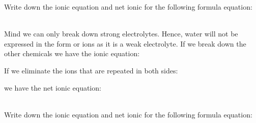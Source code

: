 \documentclass[main.tex]{subfiles} %
\begin{document}
\begin{description}
\begin{example} %
Write down the ionic equation and net ionic for the following formula equation:
\begin{center}\end{center}
\\
Mind we can only break down strong electrolytes. Hence, water will not be expressed in the form or ions as it is a weak electrolyte. If we break down the other chemicals we have the ionic equation:
\begin{center}\end{center}
If we eliminate the ions that are repeated in both sides:
\begin{center}\end{center}
we have the net ionic equation:
\begin{center}\end{center}
\faDiamond\ \\
Write down the ionic equation and net ionic for the following formula equation:
\begin{center}\end{center}
\end{example}%






\end{description}
\end{document}
